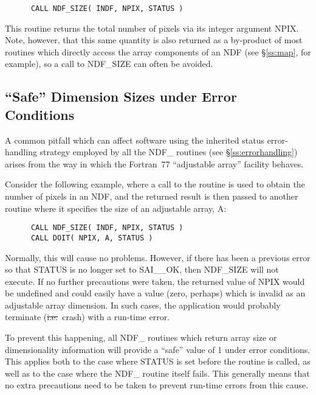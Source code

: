 \small
\begin{verbatim}
      CALL NDF_SIZE( INDF, NPIX, STATUS )
\end{verbatim}
\normalsize

This routine returns the total number of pixels via its integer argument 
NPIX.
Note, however, that this same quantity is also returned as a by-product of most
routines which directly access the array components of an NDF (see
\S\ref{ss:map}, for example), so a call to NDF\_SIZE can often be avoided.

\subsection{\label{ss:safedimensions}``Safe'' Dimension Sizes under Error Conditions}

A common pitfall which can affect software using the inherited status
error-handling strategy employed by all the NDF\_ routines (see
\S\ref{ss:errorhandling}) arises from the way in which the Fortran~77
``adjustable array'' facility behaves. 

Consider the following example, where a call to the  routine is 
used to obtain the number of pixels in an NDF, and the returned result is 
then passed to another routine where it specifies the size of an adjustable 
array, A:

\small
\begin{verbatim}
      CALL NDF_SIZE( INDF, NPIX, STATUS )
      CALL DOIT( NPIX, A, STATUS )
\end{verbatim}
\normalsize

Normally, this will cause no problems.
However, if there has been a previous error so that STATUS is no longer set
to SAI\_\_OK, then NDF\_SIZE will not execute. 
If no further precautions were taken, the returned value of NPIX would be
undefined and could easily have a value (zero, perhaps) which is invalid as
an adjustable array dimension. 
In such cases, the application would probably terminate (\st{i.e.}\ crash)
with a run-time error. 

To prevent this happening, all NDF\_ routines which return array size or
dimensionality information will provide a ``safe'' value of 1 under error
conditions. 
This applies both to the case where STATUS is set before the routine is
called, as well as to the case where the NDF\_ routine itself fails.
This generally means that no extra precautions need to be taken to prevent 
run-time errors from this cause.


